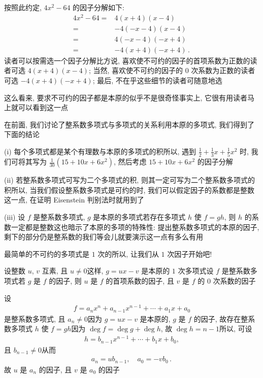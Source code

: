 \begin{example}
    按照此约定, $4x^2 - 64$ 的因子分解如下:
    \begin{align*}
        4x^2 - 64
        = {} & 4 (x + 4) (x - 4)          \\
        = {} & -4 (-x - 4) (x - 4)        \\
        = {} & 4 (-x - 4) (-x + 4)        \\
        = {} & -4 (x + 4)(-x + 4) \period
    \end{align*}
    读者可以按需选一个因子分解\period 比方说, 喜欢使不可约的因子的首项系数为正数的读者可选 $4 (x + 4) (x - 4)$; 当然, 喜欢使不可约的因子的 $0$ 次系数为正数的读者可选 $-4 (x + 4) (-x + 4)$; 最后, 不在乎这些细节的读者可随意地选\period

    这么看来, 要求不可约的因子都是本原的似乎不是很奇怪\period 事实上, 它很有用\period 读者马上就可以看到这一点\period
\end{example}

在前面, 我们讨论了整系数多项式与多项式的关系\period 利用本原的多项式, 我们得到了下面的结论\period

(i) 每个多项式都是某个有理数与本原的多项式的积\period 所以, 遇到 $\frac12 + \frac13 x + \frac15 x^2$ 时, 我们可将其写为 $\frac{1}{30} (15 + 10x + 6x^2)$, 然后考虑 $15 + 10x + 6x^2$ 的因子分解\period

(ii) 若整系数多项式可写为二个多项式的积, 则其一定可写为二个整系数多项式的积\period 所以, 当我们假设整系数多项式是可约的时, 我们可以假定因子的系数都是整数\period 这一点, 在证明 Eisenstein 判别法时就用到了\period

(iii) 设 $f$ 是整系数多项式, $g$ 是本原的多项式\period 若存在多项式 $h$ 使 $f = gh$, 则 $h$ 的系数一定都是整数\period 这也暗示了本原的多项的特殊性: 提出整系数多项式的本原的因子, 剩下的部分仍是整系数的\period 我们等会儿就要演示这一点有多么有用\period

最简单的不可约的多项式是 $1$ 次的\period 所以, 让我们从 $1$ 次因子开始吧!

\begin{proposition}
    设整数 $u$, $v$ 互素, 且 $u \neq 0$\period 这样, $g = ux - v$ 是本原的 $1$ 次多项式\period 设 $f$ 是整系数多项式\period 若 $g$ 是 $f$ 的因子, 则 $u$ 是 $f$ 的首项系数的因子, 且 $v$ 是 $f$ 的 $0$ 次系数的因子\period
\end{proposition}

\begin{pf}
    设
    \begin{align*}
        f = a_n x^n + a_{n-1} x^{n-1} + \cdots + a_1 x + a_0
    \end{align*}
    是整系数多项式, 且 $a_n \neq 0$\period 因为 $g = ux - v$ 是本原的, $g$ 是 $f$ 的因子, 故存在整系数多项式 $h$ 使 $f = gh$\period 因为 $\deg f = \deg g + \deg h$, 故 $\deg h = n - 1$\period 所以, 可设
    \begin{align*}
        h = b_{n-1} x^{n-1} + \cdots + b_1 x + b_0,
    \end{align*}
    且 $b_{n-1} \neq 0$\period 从而
    \begin{align*}
        a_n = ub_{n-1}, \quad a_0 = -vb_0 \period
    \end{align*}
    故 $u$ 是 $a_n$ 的因子, 且 $v$ 是 $a_0$ 的因子\period
\end{pf}

